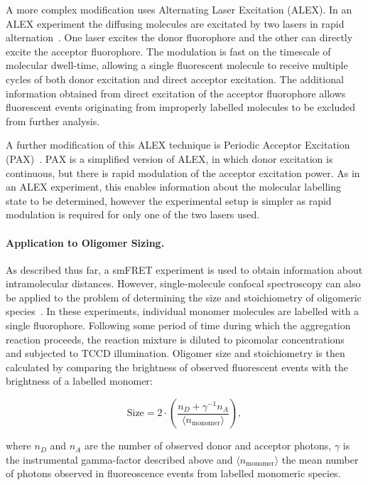 A more complex modification uses Alternating Laser Excitation (ALEX). In an ALEX experiment the diffusing molecules are excitated by two lasers in rapid alternation~\cite{kapanidis05}. One laser excites the donor fluorophore and the other can directly excite the acceptor fluorophore. The modulation is fast on the timescale of molecular dwell-time, allowing a single fluorescent molecule to receive multiple cycles of both donor excitation and direct acceptor excitation. The additional information obtained from direct excitation of the acceptor fluorophore allows fluorescent events originating from improperly labelled molecules to be excluded from further analysis. 

A further modification of this ALEX technique is Periodic Acceptor Excitation (PAX)~\cite{doose07}. PAX is a simplified version of ALEX, in which donor excitation is continuous, but there is rapid modulation of the acceptor excitation power. As in an ALEX experiment, this enables information about the molecular labelling state to be determined, however the experimental setup is simpler as rapid modulation is required for only one of the two lasers used.

\paragraph{Application to Oligomer Sizing.}
As described thus far, a smFRET experiment is used to obtain information about intramolecular distances. However, single-molecule confocal spectroscopy can also be applied to the problem of determining the size and stoichiometry of oligomeric species~\cite{orte10, cremades2012}. In these experiments, individual monomer molecules are labelled with a single fluorophore. Following some period of time during which the aggregation reaction proceeds, the reaction mixture is diluted to picomolar concentrations and subjected to TCCD illumination.  Oligomer size and stoichiometry is then calculated by comparing the brightness of observed fluorescent events with the brightness of a labelled monomer:

\begin{equation}
\text{Size} = 2 \cdot \left(\frac{n_D + \gamma^{-1}n_A}{\langle n_{\text{monomer}}\rangle}\right),
\label{eq:sizing}
\end{equation}

where $n_D$ and $n_A$ are the number of observed donor and acceptor photons, $\gamma$ is the instrumental gamma-factor described above and $\langle n_{\text{monomer}}\rangle$ the mean number of photons observed in fluoreoscence events from labelled monomeric species.

